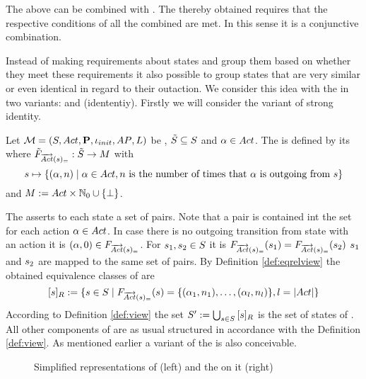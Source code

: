 \documentclass[preview]{standalone}
\begin{document}
The \viewsN above can be combined with \parllcompN. The thereby obtained \viewN requires that the respective conditions of all the combined \viewsN are met. In this sense it is a conjunctive combination.

Instead of making requirements about states and group them based on whether they meet these requirements it also possible to group states that are very similar or even identical in regard to their outaction. We consider this idea with the \emph{\outactident \viewNC} in two variants: \outactidentstrong and \outactidentweak (idententiy). Firstly we will consider the variant of strong identity.

\begin{definition}
	Let ${{{\mathcal{M}}}} = {{({S}, {Act}, {\textbf{P}}, {\iota_{init}}, {AP}, {L})}}$ be \achgphN, ${\tilde{{S}}} \subseteq {S}$ and ${\alpha} \in {Act}$. The \viewN \viewstrongoutactident is defined by its \grpfctN where ${{\tilde{F}_{{{\overrightarrow{{Act}}}({s})_=}}}} : {\tilde{{S}}} \to {\ensuremath{{M}}}$ with
	\[
	\state \mapsto	
	\{(\action, \numoutact) \mid \action \in \actions, \numoutact \text{ is the number of times that \action is outgoing from } \state\}
	\]
	and ${{M}} := {Act} \times {\mathbb{N}}_0 \cup {\{\bot\}}$.
\end{definition}

The \grpfctN asserts to each state a set of pairs. Note that a pair is contained int the set for each action ${\alpha} \in {Act}$. In case there is no outgoing transition from state \state with an action \action it is $({\alpha}, 0) \in {\ensuremath{{F_{{{\overrightarrow{{Act}}}({s})_=}}}}}$. For ${s}_1, {s}_2 \in {S}$ it is ${{F_{{{\overrightarrow{{Act}}}({s})_=}}}}({s}_1) = {{F_{{{\overrightarrow{{Act}}}({s})_=}}}}({s}_2)$ \iffN ${s}_1$ and ${s}_2$ are mapped to the same set of pairs. By Definition \ref{def:eqrelview} the obtained equivalence classes of \eqrelview are
\[
	{{[{s}]_{{R}}}} := \{{s} \in {S} \mid {\ensuremath{{F_{{{\overrightarrow{{Act}}}({s})_=}}}}}({s}) = \{({\alpha}_1, {n}_1), \dots, ({\alpha}_l, {n}_l)\}, l = |{Act}|\}
\]
According to Definition \ref{def:view} the set ${S}' := \bigcup_{{s} \in {S}} {{[{s}]_{{R}}}}$ is the set of states of \viewstrongoutactident. All other components of \viewstrongoutactident are as usual structured in accordance with the Definition \ref{def:view}.
As mentioned earlier a \outactidentweak variant of the \outactident \viewN is also conceivable.

\begin{figure}[h]
	\begin{minipage}{.5\textwidth}
		\hspace{5mm}
		
	\end{minipage}%
	\begin{minipage}{.5\textwidth}		
		\hspace{5mm}
		
	\end{minipage}
	
	\caption{Simplified representations of \mdp (left) and the \viewN \viewstrongoutactident on it (right)}
	\label{fig:outActIdentStrongAfter}

\end{figure}
\end{document}
